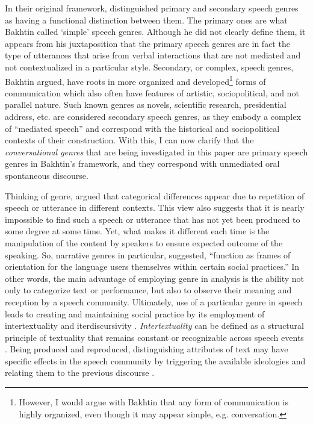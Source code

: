 \documentclass[12pt]{article}
\begin{document}
In their original framework, \textcite{bakhtin1986} distinguished primary and secondary speech genres as having a functional distinction between them. The primary ones are what Bakhtin called `simple' speech genres. Although he did not clearly define them, it appears from his juxtaposition that the primary speech genres are in fact the type of utterances that arise from verbal interactions that are not mediated and not contextualized in a particular style. Secondary, or complex, speech genres, Bakhtin argued, have roots in more organized and developed\footnote{However, I would argue with Bakhtin that any form of communication is highly organized, even though it may appear simple, e.g. conversation.} forms of communication which also often have features of artistic, sociopolitical, and not parallel nature. Such known genres as novels, scientific research, presidential address, etc. are considered secondary speech genres, as they embody a complex of ``mediated speech'' and correspond with the historical and sociopolitical contexts of their construction. With this, I can now clarify that the \textit{conversational genres} that are being investigated in this paper are  primary speech genres in Bakhtin's framework, and they correspond with unmediated oral spontaneous discourse.


Thinking of genre, \textcite{bakhtin1986} argued that categorical differences appear due to repetition of speech or utterance in different contexts. This view also suggests that it is nearly impossible to find such a speech or utterance that has not yet been produced to some degree at some time. Yet, what makes it different each time is the manipulation of the content by speakers to ensure expected outcome of the speaking. So, narrative genres in particular, \textcite[p. 181]{hyvarinen2015} suggested, ``function as frames of orientation for the language users themselves within certain social practices.'' In other words, the main advantage of employing genre in analysis is the ability not only to categorize text or performance, but also to observe their meaning and reception by a speech community. Ultimately, use of a particular genre in speech leads to creating and maintaining social practice by its employment of intertextuality \parencite{briggs1992} and iterdiscursivity \parencite{wortham2015}. \textit{Intertextuality} can be defined as a structural principle of textuality that remains constant or recognizable across speech events \parencite{wortham2015}. Being produced and reproduced, distinguishing attributes of text may have specific effects in the speech community by triggering the available ideologies and relating them to the previous discourse \parencite{bakhtin1986}.
\end{document}
